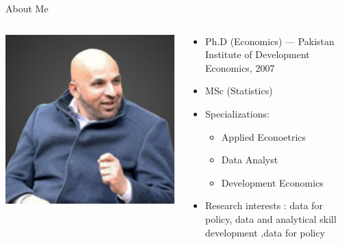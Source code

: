 \documentclass[
  ignorenonframetext,
]{beamer}
\providecommand{\tightlist}{%
  \setlength{\itemsep}{0pt}\setlength{\parskip}{0pt}}\usepackage{longtable,booktabs,array}
\begin{document}
\begin{frame}{About Me}
\protect\hypertarget{about-me}{}
\begin{columns}[T]
\begin{column}{0.3\textwidth}
\includegraphics[width=6.25in,height=\textheight]{images/zahid.jpg}
\end{column}

\begin{column}{0.7\textwidth}
\begin{itemize}
\tightlist
\item
  Ph.D (Economics) --- Pakistan Institute of Development Economics, 2007
\item
  MSc (Statistics)
\item
  Specializations:

  \begin{itemize}
  \tightlist
  \item
    Applied Econoetrics
  \item
    Data Analyst
  \item
    Development Economics
  \end{itemize}
\item
  Research interests : data for policy, data and analytical skill
  development ,data for policy
\end{itemize}
\end{column}
\end{columns}
\end{frame}
\end{document}
